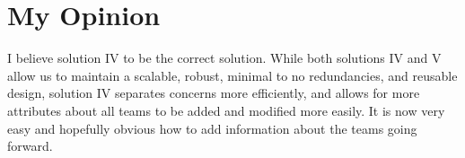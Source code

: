 \documentclass{article}
\begin{document}
\section{My Opinion}  I believe solution IV to be the correct solution. While both solutions IV and V allow us to maintain a scalable, robust, minimal to no redundancies, and reusable design, solution IV separates concerns more efficiently, and allows for more attributes about all teams to be added and modified more easily. It is now very easy and hopefully obvious how to add information about the teams going forward.
\end{document}
